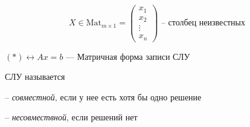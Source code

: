 \[
    X \in \text{Mat}_{m \times 1} = \begin{pmatrix}
        x_1 \\ x_2 \\ \vdots \\ x_n
    \end{pmatrix} \text{ -- столбец неизвестных}
\]


$(*) \leftrightarrow Ax = b$ ---
Матричная форма записи СЛУ

\begin{definition}
    СЛУ называется 

    -- \textit{совместной}, если у нее есть хотя бы одно решение

    -- \textit{несовмествной}, если решений нет
\end{definition}

